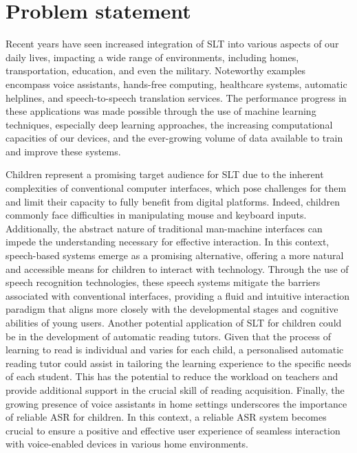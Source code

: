 \section{Problem statement}
Recent years have seen increased integration of \ac{SLT} into various aspects of our daily lives, impacting a wide range of environments, including homes, transportation, education, and even the military. Noteworthy examples encompass voice assistants, hands-free computing, healthcare systems, automatic helplines, and speech-to-speech translation services. The performance progress in these applications was made possible through the use of machine learning techniques, especially deep learning approaches, the increasing computational capacities of our devices, and the ever-growing volume of data available to train and improve these systems.

Children represent a promising target audience for \ac{SLT} due to the inherent complexities of conventional computer interfaces, which pose challenges for them and limit their capacity to fully benefit from digital platforms. Indeed, children commonly face difficulties in manipulating mouse and keyboard inputs. Additionally, the abstract nature of traditional man-machine interfaces can impede the understanding necessary for effective interaction. In this context, speech-based systems emerge as a promising alternative, offering a more natural and accessible means for children to interact with technology. Through the use of speech recognition technologies, these speech systems mitigate the barriers associated with conventional interfaces, providing a fluid and intuitive interaction paradigm that aligns more closely with the developmental stages and cognitive abilities of young users. Another potential application of \ac{SLT} for children could be in the development of automatic reading tutors. Given that the process of learning to read is individual and varies for each child, a personalised automatic reading tutor could assist in tailoring the learning experience to the specific needs of each student. This has the potential to reduce the workload on teachers and provide additional support in the crucial skill of reading acquisition. Finally, the growing presence of voice assistants in home settings underscores the importance of reliable \ac{ASR} for children. In this context, a reliable ASR system becomes crucial to ensure a positive and effective user experience of seamless interaction with voice-enabled devices in various home environments.

